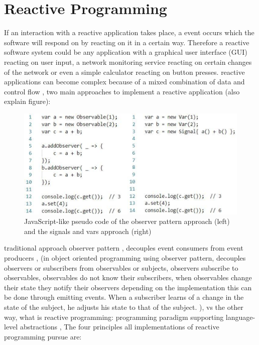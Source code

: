 \documentclass[Bachelor,BIF,english]{twbook}
\begin{document}
\section{Reactive Programming}
If an interaction with a reactive application takes place, a event occurs which the software will respond on by reacting on it in a certain way. Therefore a reactive software system could be any application with a graphical user interface (GUI) reacting on user input, a network monitoring service reacting on certain changes of the network or even a simple calculator reacting on button presses. reactive applications can become complex because of a mixed combination of data and control flow \cite[p.~1]{PositivEffectOfRP}, 
two main approaches to implement a reactive application (also explain figure):
\begin{figure}[!htbp]
\centering
\includegraphics[width=0.75\linewidth]{PICs/pseudo_Code_reactive_2_ways.eps}
\caption{JavaScript-like pseudo code of the observer pattern approach (left) and the signals and vars approach (right) \cite[p.~797]{DebuggingRP} \cite[p.~3]{PositivEffectOfRP}}\label{Fig1}
\end{figure}
traditional approach observer pattern \cite[p.~360-372]{ObserverDP}, decouples event consumers from event producers \cite[p.~953]{RPWalkthrough}, (in object oriented programming using observer pattern, decouples observers or subscribers from observables or subjects, observers subscribe to observables, observables do not know their subscribers, when observables change their state they notify their observers depending on the implementation this can be done through emitting events. When a subscriber learns of a change in the state of the subject, he adjusts his state to that of the subject. \cite[p.~363]{ObserverDP}),
vs the other way, what is reactive programming: programming paradigm supporting language-level abstractions \cite[p.~953]{RPWalkthrough}, The four principles all implementations of reactive programming pursue are:
\end{document}
